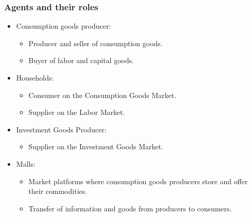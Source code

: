 \documentclass{beamer}
\begin{document}
\frame
{
  \frametitle{Agents and their roles} 
\begin{itemize}
	\item Consumption goods producer:
	
\begin{itemize}
	\item Producer and seller of consumption goods.
	\item Buyer of labor and capital goods. 
\end{itemize}

	\item Households:
	
\begin{itemize}
	\item Consumer on the Consumption Goods Market.
	\item Supplier on the Labor Market.
\end{itemize}

\item Investment Goods Producer:

\begin{itemize}
	\item Supplier on the Investment Goods Market.
\end{itemize}

\item Malls:

\begin{itemize}
	\item Market platforms where consumption goods producers store and offer their commodities.
	\item Transfer of information and goods from producers to consumers.
\end{itemize}
	
\end{itemize}
	

}
\end{document}
